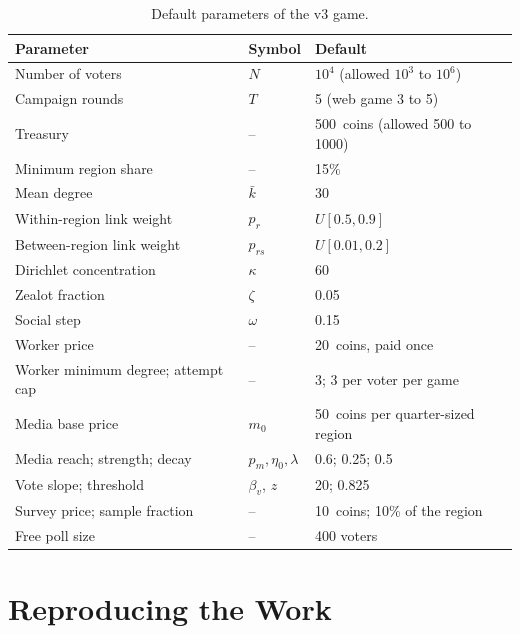 \documentclass[11pt,a4paper,oneside]{report}
\newcommand{\coins}[1]{#1~coins}
\begin{document}
\begin{table}[h]
\centering
\caption{Default parameters of the v3 game.}
\label{tab:params}
\small
\begin{tabularx}{\linewidth}{@{}Xll@{}}
\toprule
Parameter & Symbol & Default \\
\midrule
Number of voters                          & $N$            & $10^4$ (allowed $10^3$ to $10^6$) \\
Campaign rounds                           & $T$            & 5 (web game 3 to 5) \\
Treasury                                  & --             & \coins{500} (allowed 500 to 1000) \\
Minimum region share                      & --             & 15\% \\
Mean degree                               & $\bar k$       & 30 \\
Within-region link weight                 & $p_r$          & $U[0.5, 0.9]$ \\
Between-region link weight                & $p_{rs}$       & $U[0.01, 0.2]$ \\
Dirichlet concentration                   & $\kappa$       & 60 \\
Zealot fraction                           & $\zeta$        & 0.05 \\
Social step                               & $\omega$       & 0.15 \\
Worker price                              & --             & \coins{20}, paid once \\
Worker minimum degree; attempt cap        & --             & 3; 3 per voter per game \\
Media base price                          & $m_0$          & \coins{50} per quarter-sized region \\
Media reach; strength; decay              & $p_m,\eta_0,\lambda$ & 0.6; 0.25; 0.5 \\
Vote slope; threshold                     & $\beta_v$, $z$ & 20; 0.825 \\
Survey price; sample fraction             & --             & \coins{10}; 10\% of the region \\
Free poll size                            & --             & 400 voters \\
\bottomrule
\end{tabularx}
\end{table}

\chapter{Reproducing the Work}\label{app:repro}
\end{document}
